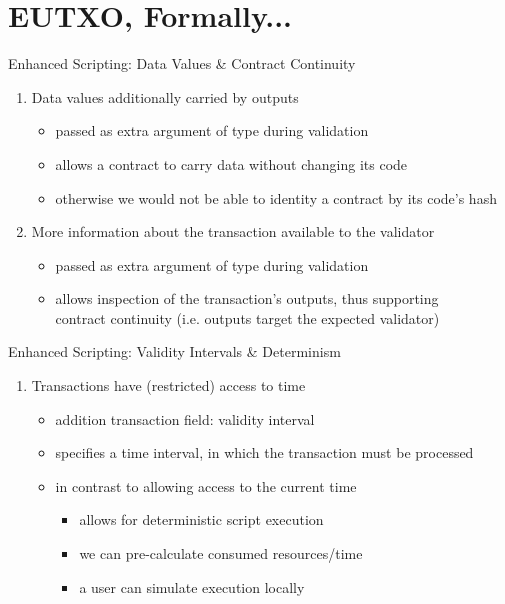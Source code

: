 \section{EUTXO, Formally...}

\begin{frame}{Enhanced Scripting: Data Values \& Contract Continuity}

\begin{enumerate}
\item \alert{Data values} additionally carried by outputs
  \begin{itemize}
  \item passed as extra argument of type  during validation
  \item allows a contract to carry data without changing its code
  \item otherwise we would not be able to identity a contract by its code's hash
  \end{itemize}
\item More information about the transaction available to the validator
  \begin{itemize}
  \item passed as extra argument of type  during validation
  \item allows inspection of the transaction's outputs, thus supporting\\
\alert{contract continuity} (i.e. outputs target the expected validator)
  \end{itemize}
\seti
\end{enumerate}

\end{frame}

\begin{frame}{Enhanced Scripting: Validity Intervals \& Determinism}

\begin{enumerate}
\conti
\item Transactions have (restricted) access to time
  \begin{itemize}
  \item addition transaction field: \alert{validity interval}
  \item specifies a time interval, in which the transaction must be processed
  \item in contrast to allowing access to the current time
    \begin{itemize}
    \item allows for \alert{deterministic} script execution
    \item we can pre-calculate consumed resources/time
    \item a user can simulate execution locally
    \end{itemize}
  \end{itemize}
\end{enumerate}

\end{frame}



